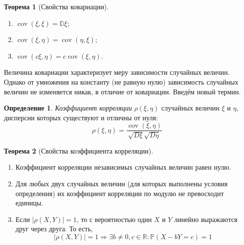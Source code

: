 \documentclass[oneside,final,14pt]{extreport}
\theoremstyle{plain}
\theoremstyle{definition}
\newtheorem*{defn}{Определение}
\theoremstyle{named}
\newtheorem*{namedthm}{Теорема}
\begin{document}
\begin{namedthm}[Свойства ковариации]\leavevmode
    \begin{enumerate}
        \item $\operatorname{cov}(\xi, \xi)=\mathbb{D} \xi$;
        \item $\operatorname{cov}(\xi, \eta)=\operatorname{cov}(\eta, \xi)$;
        \item $\operatorname{cov}(c \xi, \eta)=c \operatorname{cov}(\xi, \eta)$.
    \end{enumerate}
\end{namedthm}

Величина ковариации характеризует меру зависимости случайных величин. Однако от умножения на константу (не равную нулю) зависимость случайных величин не изменяется никак, в отличие от ковариации. Введём новый термин.

\begin{defn}
    {\it Коэффициент корреляции} $\rho(\xi,\eta)$ случайных величин $\xi$ и $\eta$, дисперсии которых существуют и отличны от нуля:
    \begin{equation*}
        \rho(\xi, \eta)=\frac{\operatorname{cov}(\xi, \eta)}{\sqrt{D \xi} \sqrt{D \eta}}
    \end{equation*}
\end{defn}

\begin{namedthm}[Свойства коэффициента корреляции]\leavevmode
    \begin{enumerate}
        \item Коэффициент корреляции независимых случайных величин равен нулю.
        \item Для любых двух случайных величин (для которых выполнены условия определения) их коэффициент корреляции по модулю не превосходит единицы.
        \item Если $|\rho(X,Y)| = 1$, то с вероятностью один $X$ и $Y$ линейно выражаются друг через друга. То есть,
        \begin{equation*}
            |\rho(X, Y)|=1 \Longrightarrow \exists b \neq 0, c \in \mathbb{R}: \mathbb{P}(X-b Y=c)=1
        \end{equation*}
    \end{enumerate}
\end{namedthm}
\end{document}
